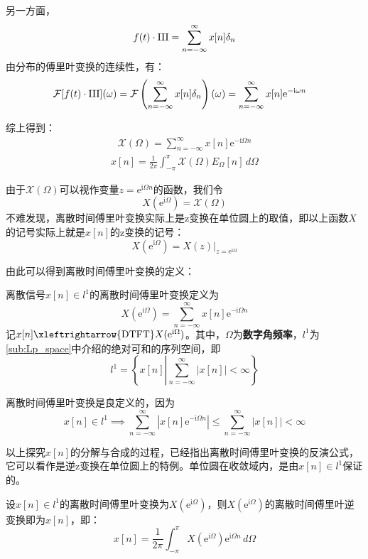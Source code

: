 另一方面，
$$f(t)\cdot\operatorname{III}=\sum_{n=-\infty}^{\infty}x[n]\delta_{n}$$
由分布的傅里叶变换的连续性，有：
\begin{align*}
    \mathcal{F} [f(t)\cdot\operatorname{III}](\omega)&=\mathcal{F} \left(\sum_{n=-\infty}^{\infty}x[n]\delta_{n}\right)(\omega)=\sum_{n=-\infty}^{\infty}x[n]\mathrm{e}^{-\mathrm{i}\omega n}
\end{align*}

综上得到：\begin{align*}
    \mathcal{X} (\Omega)=\sum_{n=-\infty}^{\infty}x[n]\mathrm{e}^{-\mathrm{i}\Omega n}
\end{align*}
\begin{align*}
    x[n]=\frac{1}{2\pi}\int_{-\pi}^{\pi}\mathcal{X} (\Omega)E_{\Omega}[n]\,d\Omega
\end{align*}

由于$\mathcal{X} (\Omega)$可以视作变量$z=\mathrm{e}^{\mathrm{i}\Omega n}$的函数，我们令
$$X(\mathrm{e}^{\mathrm{i}\Omega})=\mathcal{X} (\Omega)$$
不难发现，离散时间傅里叶变换实际上是z变换在单位圆上的取值，即以上函数$X$的记号实际上就是$x[n]$的z变换的记号：
\[X(\mathrm{e}^{\mathrm{i}\Omega})=X(z)|_{z=\mathrm{e}^{\mathrm{i}\Omega}}\]

由此可以得到离散时间傅里叶变换的定义：

\begin{definition}[离散时间傅里叶变换]
    离散信号$x[n]\in l^1$的离散时间傅里叶变换定义为
    \[X(\mathrm{e}^{\mathrm{i}\Omega})=\sum_{n=-\infty}^{\infty}x[n]\mathrm{e}^{-\mathrm{i}\Omega n}\]
    记$x[n]\xleftrightarrow{\text{DTFT}}X(\mathrm{e}^{\mathrm{i}\Omega})$。其中，$\Omega $为\textbf{数字角频率}，$l^1$为\ref{sub:Lp_space}中介绍的绝对可和的序列空间，即
    \[l^1=\left\{x[n]\left|\sum_{n=-\infty}^{\infty}|x[n]|<\infty\right.\right\}\]
\end{definition}

离散时间傅里叶变换是良定义的，因为
\[x[n]\in l^1\implies \sum_{n=-\infty}^{\infty}\left|x[n]\mathrm{e}^{-\mathrm{i}\Omega n}\right|\leq \sum_{n=-\infty}^{\infty}|x[n]|<\infty\]

以上探究$x[n]$的分解与合成的过程，已经指出离散时间傅里叶变换的反演公式，它可以看作是逆z变换在单位圆上的特例。单位圆在收敛域内，是由$x[n]\in l^1$保证的。
\begin{theorem}[离散时间傅里叶反演公式]
    设$x[n]\in l^1$的离散时间傅里叶变换为$X(\mathrm{e}^{\mathrm{i}\Omega})$，则$X(\mathrm{e}^{\mathrm{i}\Omega})$的离散时间傅里叶逆变换即为$x[n]$，即：
    \[x[n]=\frac{1}{2\pi}\int_{-\pi}^{\pi}X(\mathrm{e}^{\mathrm{i}\Omega})\mathrm{e}^{\mathrm{i}\Omega n}\,d\Omega\]
\end{theorem}

